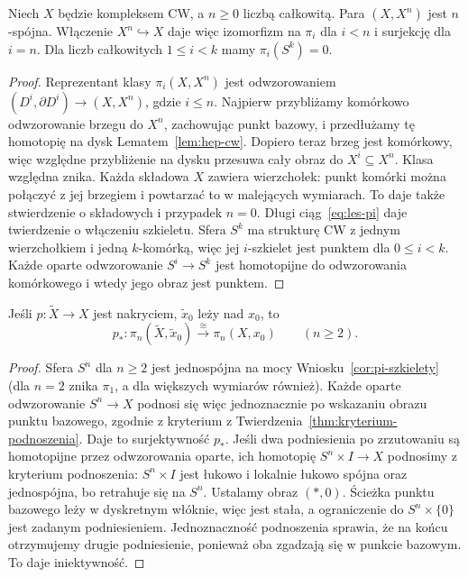 \begin{wniosek}
\label{cor:pi-szkielety}
Niech $X$ będzie kompleksem CW, a $n\geq0$
liczbą całkowitą. Para $(X,X^n)$ jest $n$-spójna.
Włączenie $X^n\hookrightarrow X$
daje więc izomorfizm na
$\pi_i$ dla $i<n$
i surjekcję dla $i=n$.
Dla liczb całkowitych $1\leq i<k$ mamy
$\pi_i(S^k)=0$.
\end{wniosek}
\begin{proof}
Reprezentant klasy
$\pi_i(X,X^n)$ jest
odwzorowaniem $(D^i,\partial D^i)\to
(X,X^n)$, gdzie $i\leq n$.
Najpierw przybliżamy komórkowo odwzorowanie brzegu do $X^n$,
zachowując punkt bazowy, i przedłużamy tę homotopię na dysk
Lematem~\ref{lem:hep-cw}. Dopiero teraz brzeg jest komórkowy,
więc względne przybliżenie na dysku przesuwa cały obraz do
$X^i\subseteq X^n$. Klasa względna znika.
Każda składowa $X$ zawiera wierzchołek: punkt komórki można
połączyć z jej brzegiem i powtarzać to w malejących wymiarach.
To daje także stwierdzenie o składowych i przypadek $n=0$.
Długi ciąg~\eqref{eq:les-pi}
daje twierdzenie o
włączeniu szkieletu.
Sfera $S^k$ ma strukturę CW
z jednym wierzchołkiem
i jedną $k$-komórką,
więc jej $i$-szkielet
jest punktem dla $0\leq i<k$.
Każde oparte odwzorowanie
$S^i\to S^k$ jest
homotopijne do odwzorowania
komórkowego i wtedy
jego obraz jest punktem.
\end{proof}

\begin{stwierdzenie}
\label{prop:pi-n-nakrycie}
Jeśli $p:\widetilde X\to X$
jest nakryciem, $\widetilde x_0$
leży nad $x_0$, to
\[
 p_*:\pi_n(\widetilde X,\widetilde x_0)
 \xrightarrow{\ \cong\ }
 \pi_n(X,x_0)\qquad(n\geq2).
\]
\end{stwierdzenie}
\begin{proof}
Sfera $S^n$ dla $n\geq2$
jest jednospójna na mocy
Wniosku~\ref{cor:pi-szkielety}
(dla $n=2$ znika $\pi_1$,
a dla większych wymiarów
również). Każde oparte
odwzorowanie $S^n\to X$ podnosi
się więc jednoznacznie
po wskazaniu obrazu
punktu bazowego,
zgodnie z kryterium
z Twierdzenia~\ref{thm:kryterium-podnoszenia}.
Daje to surjektywność $p_*$.
Jeśli dwa podniesienia
po zrzutowaniu są
homotopijne przez odwzorowania oparte,
ich homotopię
$S^n\times I\to X$ podnosimy z kryterium podnoszenia:
$S^n\times I$ jest łukowo i lokalnie łukowo spójna oraz jednospójna,
bo retrahuje się na $S^n$. Ustalamy obraz $(\ast,0)$.
Ścieżka punktu bazowego leży w dyskretnym włóknie, więc jest stała,
a ograniczenie do $S^n\times\{0\}$ jest zadanym podniesieniem.
Jednoznaczność podnoszenia
sprawia, że na końcu
otrzymujemy drugie
podniesienie, ponieważ
oba zgadzają się w
punkcie bazowym.
To daje iniektywność.
\end{proof}

